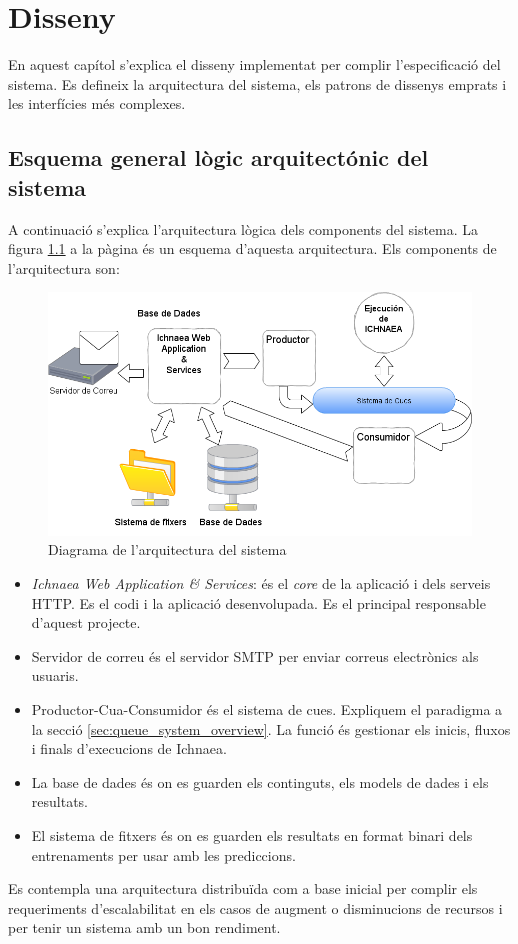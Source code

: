 \chapter{Disseny}
\label{cha:dessign}

En aquest cap\'{i}tol s'explica el disseny implementat per complir l'especificació del sistema. Es defineix la arquitectura del sistema, els patrons de dissenys emprats i les interfícies m\'{e}s complexes. 

\section{Esquema general l\`{o}gic arquitect\'{o}nic del sistema}
A continuació s'explica l'arquitectura lògica dels components del sistema. La figura \ref{fig:archsoftware} a la p\`{a}gina \pageref{fig:archsoftware} \'{e}s un esquema d'aquesta arquitectura. Els components de l'arquitectura son:\\

\begin{figure}[h!]
  \includegraphics[scale=0.5]{img/design/ArchitectureSoftware.png}
  \caption{Diagrama de l'arquitectura del sistema}
  \label{fig:archsoftware}
\end{figure}

\begin{itemize}
\item \textit{Ichnaea Web Application \& Services}: \'{e}s el \textit{core} de la aplicaci\'{o} i dels serveis HTTP. Es el codi i la aplicació desenvolupada. Es el principal responsable d'aquest projecte.
\item Servidor de correu \'{e}s el servidor SMTP per enviar correus electr\`{o}nics als usuaris.
\item Productor-Cua-Consumidor \'{e}s el sistema de cues. Expliquem el paradigma a la secció \ref{sec:queue_system_overview}. La funci\'{o} \'{e}s gestionar els inicis, fluxos i finals d'execucions de Ichnaea.
\item La base de dades \'{e}s on es guarden els continguts, els models de dades i els resultats.
\item El sistema de fitxers \'{e}s on es guarden els resultats en format binari dels entrenaments per usar amb les prediccions.
\end{itemize}
Es contempla una arquitectura distribuïda com a base inicial per complir els requeriments d'escalabilitat en els casos de augment o disminucions de recursos i per tenir un sistema amb un bon rendiment.\\

